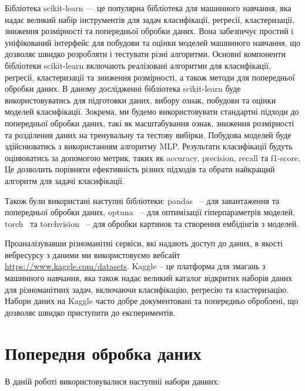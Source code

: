 Бібліотека scikit-learn --- це популярна бібліотека для машинного навчання, яка надає великий набір інструментів для задач класифікації, регресії, кластеризації, зниження розмірності та попередньої обробки даних. Вона забезпечує простий і уніфікований інтерфейс для побудови та оцінки моделей машинного навчання, що дозволяє швидко розробляти і тестувати різні алгоритми. Основні компоненти бібліотеки scikit-learn включають реалізовані алгоритми для класифікації, регресії, кластеризації та зниження розмірності, а також методи для попередньої обробки даних. В даному дослідженні бібліотека scikit-learn буде використовуватись для підготовки даних, вибору ознак, побудови та оцінки моделей класифікації. Зокрема, ми будемо використовувати стандартні підходи до попередньої обробки даних, такі як масштабування ознак, зниження розмірності та розділення даних на тренувальну та тестову вибірки. Побудова моделей буде здійснюватись з використанням алгоритму MLP. Результати класифікації будуть оцінюватись за допомогою метрик, таких як accuracy, precision, recall та f1-score. Це дозволить порівняти ефективність різних підходів та обрати найкращий алгоритм для задачі класифікації.

Також були використані наступні бібліотеки: pandas~\cite{ct21} -- для завантаження та попередньої обробки даних, optuna~\cite{ct22} -- для оптимізації гіперпараметрів моделей, torch~\cite{ct23} та torchvision~\cite{ct24} -- для обробки картинок та створення ембідінгів з моделей.

Проаналізувавши різноманітні сервіси, які надають доступ до даних, в якості вебресурсу з даними ми використовуємо вебсайт \href{https://www.kaggle.com/datasets}{https://www.kaggle.com/datasets}. Kaggle -- це платформа для змагань з машинного навчання, яка також надає великий каталог відкритих наборів даних для різноманітних задач, включаючи класифікацію, регресію та кластеризацію. Набори даних на Kaggle часто добре документовані та попередньо оброблені, що дозволяє швидко приступити до експериментів.

\section{Попередня обробка даних}

В даній роботі використовувалися наступніі набори даниих: 


